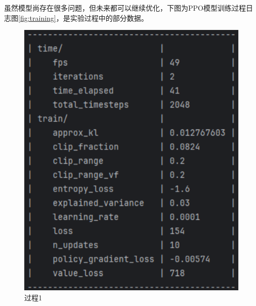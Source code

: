 虽然模型尚存在很多问题，但未来都可以继续优化，下图为PPO模型训练过程日志图\ref{fig:training}，是实验过程中的部分数据。

\begin{figure}[H]
    \centering
    \begin{minipage}{0.24\textwidth}
        \centering
        \includegraphics[width=\textwidth]{images/training1.pdf}
        \caption{过程1}
    \end{minipage}%
    \begin{minipage}{0.24\textwidth}
        \centering

\end{minipage}
\end{figure}
